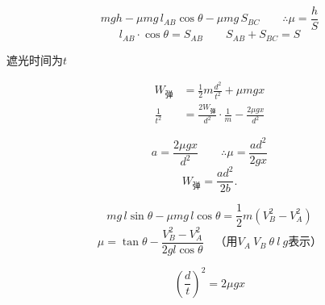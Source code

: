\[mgh-\mu mg\,l_{AB}\cos\theta-\mu mg\,S_{BC}\qquad\therefore\mu=\frac{h}{S}\] %
\[l_{AB}\cdot\cos\theta=S_{AB}\qquad S_{AB}+S_{BC}=S\]


遮光时间为$t$

\begin{align*}
W_{\text{弹}}&=\frac{1}{2}m\frac{d^2}{t^2}+\mu mgx\\
\frac{1}{t^2}&=\frac{2W_{\text{弹}}}{d^2}\cdot\frac{1}{m}-\frac{2\mu gx}{d^2}
\end{align*}


\[a=\frac{2\mu gx}{d^2}\qquad\therefore\mu=\frac{ad^2}{2gx}\]
\[W_{\text{弹}}=\frac{ad^2}{2b}.\]


\[mg\,l\sin\theta-\mu mg\,l\cos\theta=\frac{1}{2}m\left(V_B^2-V_A^2\right)\]
\[\mu=\tan\theta-\frac{V_B^2-V_A^2}{2gl\cos\theta}\quad\text{（用}V_A\ V_B\ \theta\ l\ g\text{表示）}\]


\[\left(\frac{d}{t}\right)^2=2\mu gx\]

